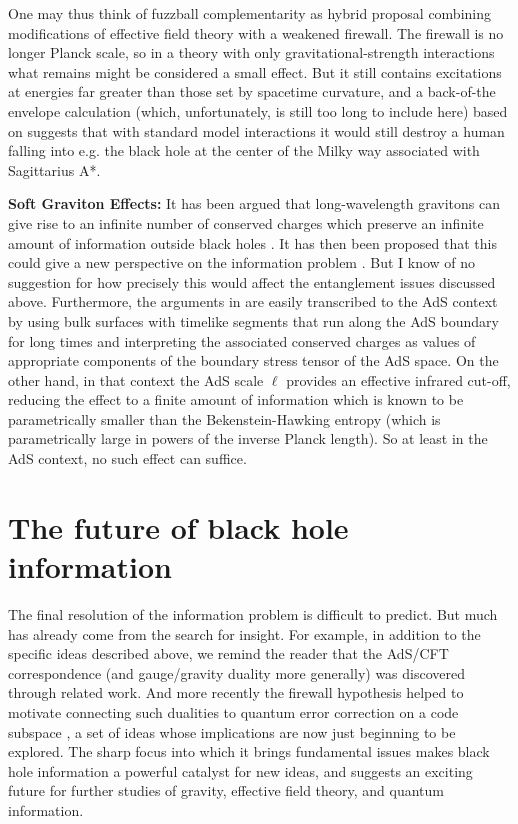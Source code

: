 \documentclass[10pt]{article}
\begin{document}
One may thus think of fuzzball complementarity as hybrid proposal combining modifications of effective field theory with a weakened firewall.  The firewall is no longer Planck scale, so in a theory with only gravitational-strength interactions what remains might be considered a small effect.  But it still contains excitations at energies far greater than those set by spacetime curvature, and a back-of-the envelope calculation (which, unfortunately, is still too long to include here) based on \cite{Amsel:2007cw} suggests that with standard model interactions it would still destroy a human falling into e.g. the black hole at the center of the Milky way associated with Sagittarius A*.

{\bf Soft Graviton Effects:} It has been argued that long-wavelength gravitons can give rise to an infinite number of conserved charges which preserve an infinite amount of information outside black holes \cite{Strominger:2013jfa}.   It has then been proposed that this could give a new perspective on the information problem  \cite{Hawking:2016msc,Hawking:2016sgy}.   But I know of no suggestion for how precisely this would affect the entanglement issues discussed above.  Furthermore, the arguments in  \cite{Hawking:2016msc} are easily transcribed to the AdS context by using bulk surfaces with timelike segments that run along the AdS boundary for long times and interpreting the associated conserved charges as values of appropriate components of the boundary stress tensor of the AdS space.  On the other hand, in that context the AdS scale $\ell$ provides an effective infrared cut-off, reducing the effect to a finite amount of information which is known to be parametrically smaller than the Bekenstein-Hawking entropy (which is parametrically large in powers of the inverse Planck length).  So at least in the AdS context, no such effect can suffice.


\section{The future of black hole information}

The final resolution of the information problem is difficult to predict.  But much has already come from the search for insight. For example, in addition to the specific ideas described above, we remind the reader that the AdS/CFT correspondence \cite{Maldacena:1997re} (and gauge/gravity duality more generally) was discovered through related work.  And more recently the firewall hypothesis helped to motivate connecting such dualities to quantum error correction on a code subspace \cite{Almheiri:2014lwa}, a set of ideas whose implications are now just beginning to be explored.  The sharp focus into which it brings fundamental issues makes black hole information a powerful catalyst for new ideas, and suggests an exciting future for further studies of gravity, effective field theory, and quantum information.
\end{document}
